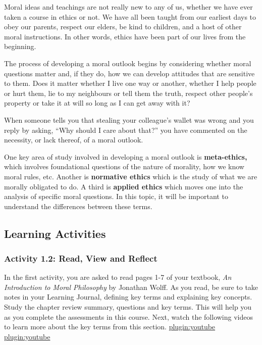 \documentclass[
]{book}
\begin{document}
Moral ideas and teachings are not really new to any of us, whether we have ever taken a course in ethics or not. We have all been taught from our earliest days to obey our parents, respect our elders, be kind to children, and a host of other moral instructions. In other words, ethics have been part of our lives from the beginning.

The process of developing a moral outlook begins by considering whether moral questions matter and, if they do, how we can develop attitudes that are sensitive to them. Does it matter whether I live one way or another, whether I help people or hurt them, lie to my neighbours or tell them the truth, respect other people's property or take it at will so long as I can get away with it?

When someone tells you that stealing your colleague's wallet was wrong and you reply by asking, ``Why should I care about that?'' you have commented on the necessity, or lack thereof, of a moral outlook.

One key area of study involved in developing a moral outlook is \textbf{meta-ethics,} which involves foundational questions of the nature of morality, how we know moral rules, etc. Another is \textbf{normative ethics} which is the study of what we are morally obligated to do. A third is \textbf{applied ethics} which moves one into the analysis of specific moral questions. In this topic, it will be important to understand the differences between these terms.

\hypertarget{learning-activities-1}{%
\subsection{Learning Activities}\label{learning-activities-1}}

\hypertarget{activity-1.2-read-view-and-reflect}{%
\subsubsection{Activity 1.2: Read, View and Reflect}\label{activity-1.2-read-view-and-reflect}}

In the first activity, you are asked to read pages 1-7 of your textbook, \emph{An Introduction to Moral Philosophy} by Jonathan Wolff. As you read, be sure to take notes in your Learning Journal, defining key terms and explaining key concepts. Study the chapter review summary, questions and key terms. This will help you as you complete the assessments in this course.
Next, watch the following videos to learn more about the key terms from this section.
\href{https://www.youtube.com/watch?v=NKEhdsnKKHs}{plugin:youtube}
\href{https://www.youtube.com/watch?v=FOoffXFpAlU}{plugin:youtube}
\end{document}
